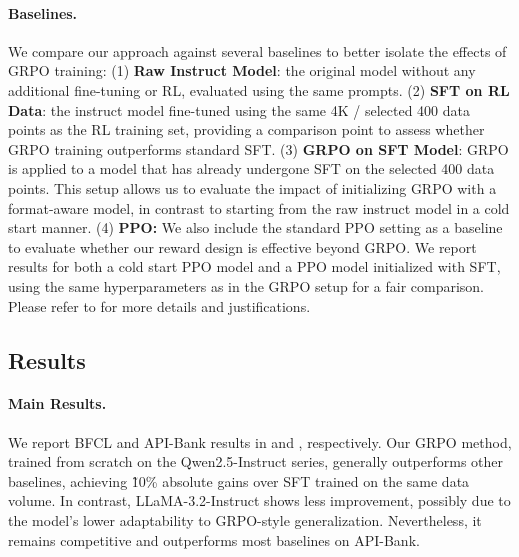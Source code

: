 \paragraph{Baselines.} We compare our approach against several baselines to better isolate the effects of GRPO training: (1) \textbf{Raw Instruct Model}: the original model without any additional fine-tuning or RL, evaluated using the same prompts. (2) \textbf{SFT on RL Data}: the instruct model fine-tuned using the same 4K / selected 400 data points as the RL training set, providing a comparison point to assess whether GRPO training outperforms standard SFT. (3) \textbf{GRPO on SFT Model}: GRPO is applied to a model that has already undergone SFT on the selected 400 data points. This setup allows us to evaluate the impact of initializing GRPO with a format-aware model, in contrast to starting from the raw instruct model in a cold start manner. (4) \textbf{PPO:} We also include the standard PPO setting as a baseline to evaluate whether our reward design is effective beyond GRPO. We report results for both a cold start PPO model and a PPO model initialized with SFT, using the same hyperparameters as in the GRPO setup for a fair comparison. Please refer to  for more details and justifications.



\subsection{Results}



\paragraph{Main Results.} We report BFCL and API-Bank results in  and , respectively. Our GRPO method, trained from scratch on the Qwen2.5-Instruct series, generally outperforms other baselines, achieving \~10\% absolute gains over SFT trained on the same data volume. In contrast, LLaMA-3.2-Instruct shows less improvement, possibly due to the model's lower adaptability to GRPO-style generalization. Nevertheless, it remains competitive and outperforms most baselines on API-Bank.

